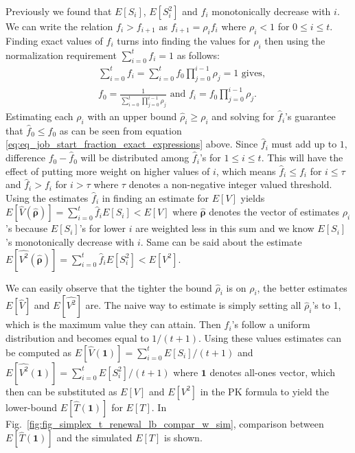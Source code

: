\documentclass[sigconf,draft]{acmart}
\begin{document}
Previously we found that $E[S_i]$, $E[S_i^2]$ and $f_i$ monotonically decrease with $i$. We can write the relation $f_i > f_{i+1}$ as $f_{i+1} = \rho_i f_i$ where $\rho_i < 1$ for $0 \leq i \leq t$. Finding exact values of $f_i$ turns into finding the values for $\rho_i$ then using the normalization requirement $\sum_{i=0}^t f_i = 1$ as follows:
\begin{equation}
  \label{eq:eq_job_start_fraction_exact_expressions}
  \begin{split}
    & \sum_{i=0}^t f_i = \sum_{i=0}^t f_0 \prod_{j=0}^{i-1} \rho_j = 1 \text{ gives}, \\
    & f_0 = \frac{1}{\sum_{i=0}^t \prod_{j=0}^{i-1} \rho_j} \text{ and } f_i = f_0 \prod_{j=0}^{i-1} \rho_j.
  \end{split}
\end{equation}
Estimating each $\rho_i$ with an upper bound $\hat{\rho}_i \geq \rho_i$ and solving for $\hat{f}_i$'s guarantee that $\hat{f}_0 \leq f_0$ as can be seen from equation \eqref{eq:eq_job_start_fraction_exact_expressions} above. Since $\hat{f}_i$ must add up to $1$, difference $f_0 - \hat{f}_0$ will be distributed among $\hat{f}_i$'s for $1 \leq i \leq t$. This will have the effect of putting more weight on higher values of $i$, which means $\hat{f}_i \leq f_i$ for $i \leq \tau$ and $\hat{f}_i > f_i$ for $i > \tau$ where $\tau$ denotes a non-negative integer valued threshold. Using the estimates $\hat{f}_i$ in finding an estimate for $E[V]$ yields $E[\hat{V}(\bm{\hat{\rho}})] = \sum_{i=0}^t \hat{f}_i E[S_i] < E[V]$ where $\bm{\hat{\rho}}$ denotes the vector of estimates $\rho_i$'s because $E[S_i]$'s for lower $i$ are weighted less in this sum and we know $E[S_i]$'s monotonically decrease with $i$. Same can be said about the estimate $E[\hat{V^2}(\bm{\hat{\rho}})] = \sum_{i=0}^t \hat{f}_i E[S_i^2] < E[V^2]$.

We can easily observe that the tighter the bound $\hat{\rho}_i$ is on $\rho_i$, the better estimates $E[\hat{V}]$ and $E[\hat{V^2}]$ are. The naive way to estimate is simply setting all $\hat{\rho}_i$'s to 1, which is the maximum value they can attain. Then $\hat{f}_i$'s follow a uniform distribution and becomes equal to $1/(t+1)$. Using these values estimates can be computed as $E[\hat{V}(\bm{1})] = \sum_{i=0}^t E[S_i]/(t+1)$ and $E[\hat{V^2}(\bm{1})] = \sum_{i=0}^t E[S_i^2]/(t+1)$ where $\bm{1}$ denotes all-ones vector, which then can be substituted as $E[V]$ and $E[V^2]$ in the PK formula to yield the lower-bound $E[\hat{T}(\bm{1})]$ for $E[T]$. In Fig.~\ref{fig:fig_simplex_t_renewal_lb_compar_w_sim}, comparison between $E[\hat{T}(\bm{1})]$ and the simulated $E[T]$ is shown.
\end{document}
